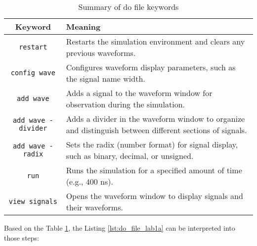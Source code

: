 \documentclass[12pt]{article}
\begin{document}
\begin{table}[htbp]
\centering
\begin{tabular}{|c|p{10cm}|}
\hline
\textbf{Keyword}           & \textbf{Meaning}                                                                                          \\ \hline
\texttt{restart}           & Restarts the simulation environment and clears any previous waveforms.                                      \\ \hline
\texttt{config wave}       & Configures waveform display parameters, such as the signal name width.                                     \\ \hline
\texttt{add wave}          & Adds a signal to the waveform window for observation during the simulation.                                \\ \hline
\texttt{add wave -divider} & Adds a divider in the waveform window to organize and distinguish between different sections of signals.   \\ \hline
\texttt{add wave -radix}   & Sets the radix (number format) for signal display, such as binary, decimal, or unsigned.                   \\ \hline
\texttt{run}               & Runs the simulation for a specified amount of time (e.g., 400 ns).                                         \\ \hline
\texttt{view signals}      & Opens the waveform window to display signals and their waveforms.                                          \\ \hline
\end{tabular}
\caption{Summary of do file keywords}\label{tab:table_do_keywords}
\end{table}

Based on the Table \ref{tab:table_do_keywords}, the Listing \ref{lst:do_file_lab1a} can be interpreted into those steps:
\end{document}
